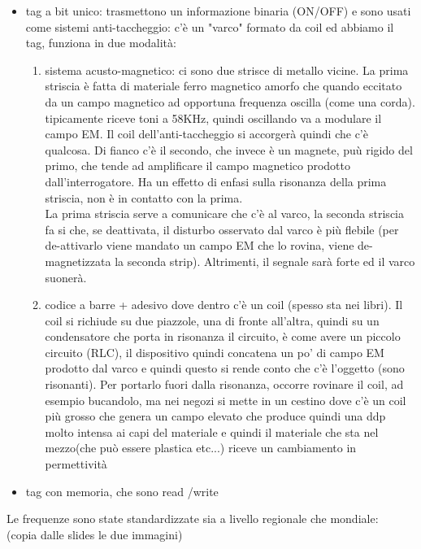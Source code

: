 \documentclass[oneside, 12pt]{extbook}
\begin{document}
\begin{itemize}
	\item tag a bit unico: trasmettono un informazione binaria (ON/OFF) e sono usati come sistemi anti-taccheggio: c'è un "varco" formato da coil ed abbiamo il tag, funziona in due modalità:
	\begin{enumerate}
		\item sistema acusto-magnetico: ci sono due strisce di metallo vicine. La prima striscia è fatta di materiale ferro magnetico amorfo che quando eccitato da un campo magnetico ad opportuna frequenza oscilla (come una corda). tipicamente riceve toni a 58KHz, quindi oscillando va a modulare il campo EM. Il coil dell'anti-taccheggio si accorgerà quindi che c'è qualcosa. Di fianco c'è il secondo, che invece è un magnete, puù rigido del primo, che tende ad amplificare il campo magnetico prodotto dall'interrogatore. Ha un effetto di enfasi sulla risonanza della prima striscia, non è in contatto con la prima.\\La prima striscia serve a comunicare che c'è al varco, la seconda striscia fa si che, se deattivata, il disturbo osservato dal varco è più flebile (per de-attivarlo viene mandato un campo EM che lo rovina, viene de-magnetizzata la seconda strip). Altrimenti, il segnale sarà forte ed il varco suonerà.
		\item codice a barre + adesivo dove dentro c'è un coil (spesso sta nei libri). Il coil si richiude su due piazzole, una di fronte all'altra, quindi su un condensatore che porta in risonanza il circuito, è come avere un piccolo circuito (RLC), il dispositivo quindi concatena un po' di campo EM prodotto dal varco e quindi questo si rende conto che c'è l'oggetto (sono risonanti). Per portarlo fuori dalla risonanza, occorre rovinare il coil, ad esempio bucandolo, ma nei negozi si mette in un cestino dove c'è un coil più grosso che genera un campo elevato che produce quindi una ddp molto intensa ai capi del materiale e quindi il materiale che sta nel mezzo(che può essere plastica etc...) riceve un cambiamento in permettività 
	\end{enumerate}
	\item tag con memoria, che sono read /write
\end{itemize}
Le frequenze sono state standardizzate sia a livello regionale che mondiale:\\
(copia dalle slides le due immagini)\\
\end{document}
